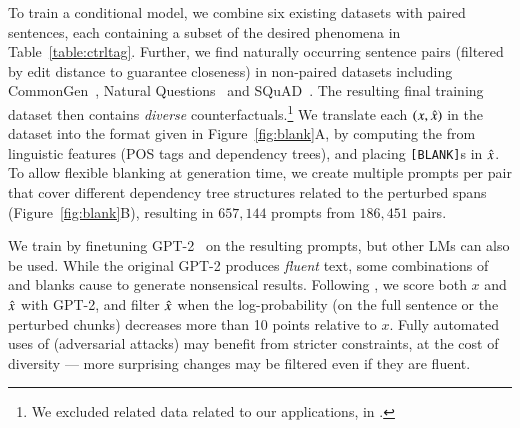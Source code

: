 

To train a conditional model, we combine six existing datasets with paired sentences, each containing a subset of the desired phenomena in Table~\ref{table:ctrltag}. 
Further, we find naturally occurring sentence pairs (filtered by edit distance to guarantee closeness) in non-paired datasets including CommonGen~\cite{lin-etal-2020-commongen}, Natural Questions~\cite{kwiatkowski-etal-2019-natural} and SQuAD~\cite{rajpurkar-etal-2016-squad}. 
The resulting final training dataset then contains \emph{diverse} counterfactuals.\footnote{We excluded related data related to our applications, \eg \qqp in \cite{zhang2019paws}. }
We translate each $(x, \hat{x})$ in the dataset into the format given in Figure~\ref{fig:blank}A, by computing the \tagstr from linguistic features (POS tags and dependency trees), and placing \texttt{[BLANK]}s in $\hat{x}$. 
To allow flexible blanking at generation time, we create multiple prompts per pair that cover  different dependency tree structures related to the perturbed spans (Figure~\ref{fig:blank}B), resulting in $657,144$ prompts from $186,451$ pairs.

We train \sysname by finetuning GPT-2~\cite{radford2019language} on the resulting prompts, but other LMs can also be used.
While the original GPT-2 produces \emph{fluent} text, some combinations of \tagstrs and blanks cause \sysname to generate nonsensical results.
Following \citet{morris2020textattack}, we score both $x$ and $\hat{x}$ with GPT-2, and filter $\hat{x}$ when the log-probability (on the full sentence or the perturbed chunks) decreases more than 10 points relative to $x$.
Fully automated uses of \sysname (\eg adversarial attacks) may benefit from stricter constraints, at the cost of diversity --- more surprising changes may be filtered even if they are fluent.


